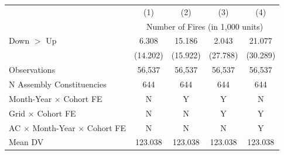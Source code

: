 {
\def\sym#1{\ifmmode^{#1}\else\(^{#1}\)\fi}
\begin{tabular}{l*{4}{c}}
\hline
            &\multicolumn{1}{c}{(1)}         &\multicolumn{1}{c}{(2)}         &\multicolumn{1}{c}{(3)}         &\multicolumn{1}{c}{(4)}             \\
            & \multicolumn{4}{c}{Number of Fires (in 1,000 units)} \\ \hline

Down $>$ Up &       6.308         &      15.186         &       2.043         &      21.077         \\
            &    (14.202)         &    (15.922)         &    (27.788)         &    (30.289)         \\
\hline
Observations&      56,537         &      56,537         &      56,537         &      56,537         \\
N Assembly Constituencies&         644         &         644         &         644         &         644         \\
Month-Year $\times$ Cohort FE&           N         &           Y         &           Y         &           N         \\
Grid $\times$ Cohort FE&           N         &           N         &           Y         &           Y         \\
AC $\times$ Month-Year $\times$ Cohort FE&           N         &           N         &           N         &           Y         \\
Mean DV     &     123.038         &     123.038         &     123.038         &     123.038         \\
\hline
\end{tabular}
}
